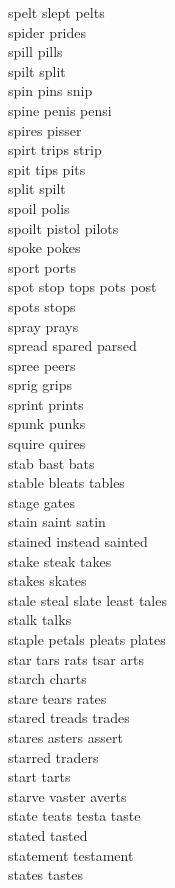 spelt slept pelts\\
spider prides\\
spill pills\\
spilt split\\
spin pins snip\\
spine penis pensi\\
spires pisser\\
spirt trips strip\\
spit tips pits\\
split spilt\\
spoil polis\\
spoilt pistol pilots\\
spoke pokes\\
sport ports\\
spot stop tops pots post\\
spots stops\\
spray prays\\
spread spared parsed\\
spree peers\\
sprig grips\\
sprint prints\\
spunk punks\\
squire quires\\
stab bast bats\\
stable bleats tables\\
stage gates\\
stain saint satin\\
stained instead sainted\\
stake steak takes\\
stakes skates\\
stale steal slate least tales\\
stalk talks\\
staple petals pleats plates\\
star tars rats tsar arts\\
starch charts\\
stare tears rates\\
stared treads trades\\
stares asters assert\\
starred traders\\
start tarts\\
starve vaster averts\\
state teats testa taste\\
stated tasted\\
statement testament\\
states tastes\\
